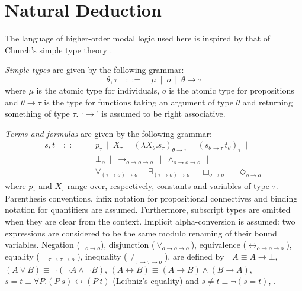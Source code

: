\documentclass[smallextended]{svjour3}
\newcommand{\imp}{\rightarrow}
\newcommand{\biimp}{\leftrightarrow}
\newcommand{\all}{\forall}
\newcommand{\ex}{\exists}
\newcommand{\nec}{\Box} %
\newcommand{\pos}{\Diamond} %
\begin{document}
\section{Natural Deduction}
\label{sec:calculus}

The language of higher-order modal logic used here is inspired by that of Church's simple type theory \citep{church}.

\begin{definition} \emph{Simple types} are given by the following grammar:
$$
  \theta,\tau \quad ::= \quad \mu \ \mid \ o \ \mid \ \theta \imp \tau
$$
where $\mu$ is the atomic type for individuals, $o$ is the atomic type for propositions and $\theta \imp \tau$ is the type for functions taking an argument of type $\theta$ and returning something of type $\tau$. `$\imp$' is assumed to be right associative.
\end{definition}

\begin{definition} \emph{Terms and formulas} are given by the following grammar:
\begin{align*}
 s,t \quad ::= \quad & 
  p_\tau \ \mid \ 
  X_\tau \ \mid \
  (\lambda X_\theta.s_\tau)_{\theta\imp\tau} \ \mid \ 
  (s_{\theta\imp\tau}\, t_\theta)_\tau \ \mid \\
& \bot_o \ \mid \
  \imp_{o\imp o\imp o} \ \mid \ 
  \wedge_{o\imp o\imp o} \ \mid \\
& \all_{(\tau\imp o)\imp o} \ \mid \ 
  \ex_{(\tau\imp o)\imp o} \ \mid \
  \nec_{o\imp o} \ \mid \
  \pos_{o\imp o}
\end{align*}
where $p_\tau$ and $X_\tau$ range over, respectively, constants and variables of type $\tau$. Parenthesis conventions, infix notation for propositional connectives and binding notation for quantifiers are assumed. Furthermore, subscript types are omitted when they are clear from the context. Implicit alpha-conversion is assumed: two expressions are considered to be the same modulo renaming of their bound variables.
Negation ($\neg_{o\imp o}$), disjunction ($\vee_{o\imp o\imp o}$), equivalence ($\biimp_{o\imp o\imp o}$), equality ($=_{\tau\imp\tau\imp o}$), inequality ($\neq_{\tau\imp\tau\imp o}$), are defined by $\neg A\equiv A\imp \bot$, $(A \vee B) \equiv \neg (\neg A \wedge \neg B)$, $ (A\biimp B)\equiv (A\imp B)\wedge (B\imp A)$, $s = t \equiv \forall P. (P \ s) \biimp (P \ t)$ (Leibniz's equality) and $s \neq t\equiv \neg (s=t)$, .
\end{definition}
\end{document}
